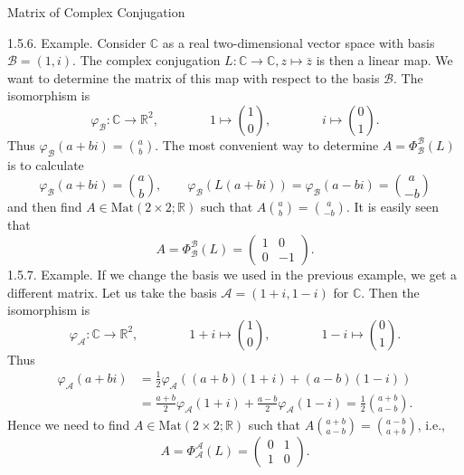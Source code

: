 \documentclass[smaller,hyperref={CJKbookmarks=true}]{beamer}
\newcommand{\C}{\mathbb{C}} \newcommand{\F}{\mathbb{F}} \newcommand{\R}{\mathbb{R}} \newcommand{\Q}{\mathbb{Q}}
\begin{document}
\begin{frame}{Matrix of Complex Conjugation}
\begin{spacing}{0.9}
\alert{1.5.6. Example.} Consider $\C$ as a real two-dimensional vector space with basis $\mathcal{B}=(1,i)$. The complex conjugation $L:\C\to\C, z\mapsto\overline{z}$ is then a linear map. We want to determine the matrix of this map with respect to the basis $\mathcal{B}$. The isomorphism is
\[\varphi_\mathcal{B}:\C\to\R^2,\qquad\qquad 1\mapsto\binom{1}{0},\qquad\qquad i\mapsto\binom{0}{1}.\]
Thus $\varphi_\mathcal{B}(a+bi)=\binom{a}{b}$. The most convenient way to determine $A=\Phi_\mathcal{B}^\mathcal{B}(L)$ is to calculate
\[\varphi_\mathcal{B}(a+bi)=\binom{a}{b},\qquad
\varphi_\mathcal{B}\left(L(a+bi)\right)=\varphi_\mathcal{B}(a-bi)=\binom{a}{-b}\]
and then find $A\in\text{Mat}(2\times 2;\R)$ such that $A\binom{a}{b}=\binom{a}{-b}$. It is easily seen that
\[A=\Phi_\mathcal{B}^\mathcal{B}(L)=\begin{pmatrix}
                                      1 & 0 \\
                                      0 & -1
                                    \end{pmatrix}.\]
\newpage
\alert{1.5.7. Example.} If we change the basis we used in the previous example,
we get a dif{}ferent matrix. Let us take the basis $\mathcal{A}=(1+i,1-i)$ for $\C$. Then the isomorphism is
\[\varphi_\mathcal{A}:\C\to\R^2,\qquad\qquad 1+i\mapsto\binom{1}{0},\qquad\qquad 1-i\mapsto\binom{0}{1}.\]
Thus
\begin{equation*}
  \begin{split}
     \varphi_\mathcal{A}(a+bi) &=\frac{1}{2}\varphi_\mathcal{A}\left((a+b)(1+i)+(a-b)(1-i)\right) \\
       &=\frac{a+b}{2}\varphi_\mathcal{A}(1+i)+\frac{a-b}{2}\varphi_\mathcal{A}(1-i)=\frac{1}{2}\binom{a+b}{a-b}.
  \end{split}
\end{equation*}
Hence we need to find $A\in\text{Mat}(2\times 2;\R)$ such that $A\binom{a+b}{a-b}=\binom{a-b}{a+b}$, i.e.,
\[A=\Phi_\mathcal{A}^\mathcal{A}(L)=\begin{pmatrix}
                                      0 & 1 \\
                                      1 & 0
                                    \end{pmatrix}.\]
\end{spacing}
\end{frame}
\end{document}

